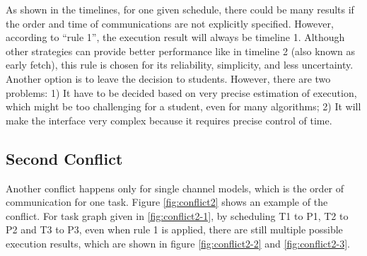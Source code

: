 \documentclass[msc,deptreport, cs]{infthesis}
\begin{document}
As shown in the timelines, for one given schedule, there could be many results if the order and time of communications are not explicitly specified. However, according to ``rule 1'', the execution result will always be timeline 1. Although other strategies can provide better performance like in timeline 2 (also known as early fetch), this rule is chosen for its reliability, simplicity, and less uncertainty. Another option is to leave the decision to students. However, there are two problems: 1) It have to be decided based on very precise estimation of execution, which might be too challenging for a student, even for many algorithms; 2) It will make the interface very complex because it requires precise control of time.

\subsection{Second Conflict} \label{sec:conflict2}

Another conflict happens only for single channel models, which is the order of communication for one task. Figure \ref{fig:conflict2} shows an example of the conflict. For task graph given in \ref{fig:conflict2-1}, by scheduling T1 to P1, T2 to P2 and T3 to P3, even when rule 1 is applied, there are still multiple possible execution results, which are shown in figure \ref{fig:conflict2-2} and \ref{fig:conflict2-3}. 
\end{document}
